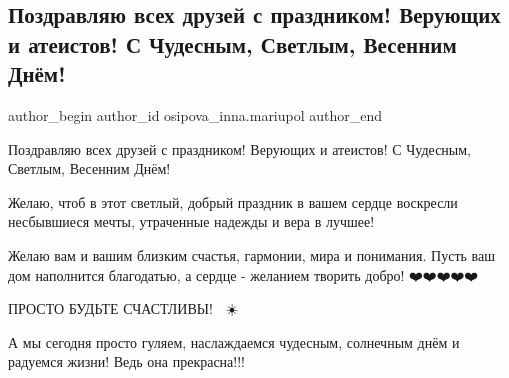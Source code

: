  
 
 
 
 

\subsection{Поздравляю всех друзей с праздником! Верующих и атеистов! С Чудесным, Светлым, Весенним Днём! }
\label{sec:28_04_2019.fb.osipova_inna.mariupol.1.pozdravljaju_vseh_druzej_s_prazdnikom}

\ifcmt
 author_begin
   author_id osipova_inna.mariupol
 author_end
\fi

Поздравляю всех друзей с праздником! Верующих и атеистов! С Чудесным, Светлым,
Весенним Днём! 

Желаю, чтоб в этот светлый, добрый праздник в вашем сердце воскресли
несбывшиеся мечты, утраченные надежды и вера в лучшее!

Желаю вам и вашим близким счастья, гармонии, мира и понимания. Пусть ваш дом
наполнится благодатью, а сердце - желанием творить добро!  ❤️❤️❤️❤️❤️

ПРОСТО БУДЬТЕ СЧАСТЛИВЫ! 🌺🌸☀️💖

А мы сегодня просто гуляем, наслаждаемся чудесным, солнечным днём и радуемся
жизни! Ведь она прекрасна!!!

